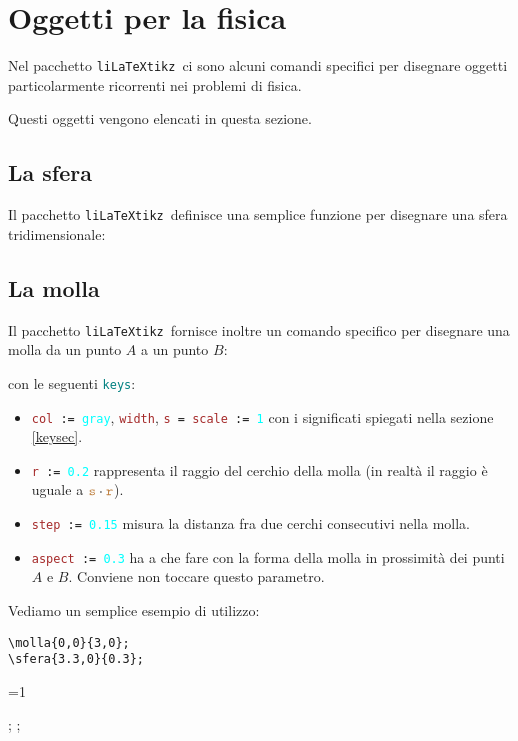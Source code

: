 \documentclass[italian, a4paper]{article}
\def\showimmagini{1} %
\newcommand{\bs}{\textbackslash}
\newcommand{\ttt}[1]{\texttt{#1}}
\newcommand{\liLaTeXtikz}{\ttt{liLaTeXtikz}}
\newcommand{\comandons}[2][\large]{\vspace*{1mm}\noindent\fbox{\parbox{\textwidth}{#1\ttt{#2}}}}
\newcommand{\comando}[2][\large]{\comandons[#1]{#2}\vspace*{3mm}}
\newcommand{\blue}[1]{\textcolor{blue}{#1}}
\newcommand{\cyan}[1]{\textcolor{cyan}{#1}}
\newcommand{\keys}{\textcolor{teal}{\ttt{keys}}}
\newcommand{\key}[1]{\textcolor{brown}{\ttt{#1}}}
\newcommand{\keyval}[1]{\cyan{\ttt{#1}}}
\begin{document}
\newpage\section{Oggetti per la fisica}
Nel pacchetto \liLaTeXtikz\ ci sono alcuni comandi specifici per disegnare oggetti particolarmente ricorrenti nei problemi di fisica.

Questi oggetti vengono elencati in questa sezione.

\subsection{La sfera}
Il pacchetto \liLaTeXtikz\ definisce una semplice funzione per disegnare una sfera tridimensionale:

\comando{\bs sfera[\key{colore} := \keyval{teal}]\{\blue{centro}\}\{\blue{raggio}\};}

\subsection{La molla}
Il pacchetto \liLaTeXtikz\ fornisce inoltre un comando specifico per disegnare una molla da un punto $A$ a un punto $B$:

\comandons{\bs molla[\keys]\{\blue{$A$}\}\{\blue{$B$}\};}
con le seguenti \keys:
\begin{itemize}[nolistsep]
\item \ttt{\key{col} := \keyval{gray}}, \key{width}, \ttt{\key{s} = \key{scale} := \keyval{1}} con i significati spiegati nella sezione \ref{keysec}.
\item \ttt{\key{r} := \keyval{0.2}} rappresenta il raggio del cerchio della molla (in realtà il raggio è uguale a $\key{s}\cdot\key{r}$).
\item \ttt{\key{step} := \keyval{0.15}} misura la distanza fra due cerchi consecutivi nella molla.
\item \ttt{\key{aspect} := \keyval{0.3}} ha a che fare con la forma della molla in prossimità dei punti $A$ e $B$. Conviene non toccare questo parametro.
\end{itemize}

Vediamo un semplice esempio di utilizzo:

\begin{Verbatim}[frame=single]
\molla{0,0}{3,0};
\sfera{3.3,0}{0.3};
\end{Verbatim}
\vspace*{-4mm}

\ifnum\showimmagini=1
\begin{immagine}
;
;
\end{immagine}
\fi
\end{document}

